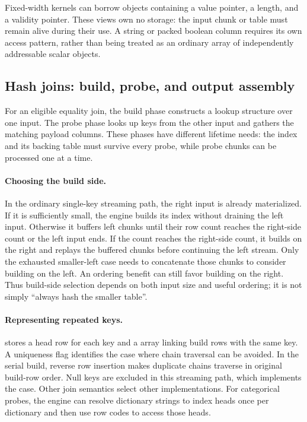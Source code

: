 Fixed-width kernels can borrow  objects containing a value
pointer, a length, and a validity pointer. These views own no storage: the
input chunk or table must remain alive during their use. A string or packed
boolean column requires its own access pattern, rather than being treated
as an ordinary array of independently addressable scalar objects.


\subsection{Hash joins: build, probe, and output assembly}
For an eligible equality join, the build phase constructs a lookup structure
over one input. The probe phase looks up keys from the other input and gathers
the matching payload columns. These phases have different lifetime needs:
the index and its backing table must survive every probe, while probe chunks
can be processed one at a time.

\paragraph{Choosing the build side.}
In the ordinary single-key streaming path, the right input is already
materialized. If it is sufficiently small, the engine builds its index without
draining the left input. Otherwise it buffers left chunks until their row count
reaches the right-side count or the left input ends. If the count reaches the
right-side count, it builds on the right and replays the buffered chunks before
continuing the left stream. Only the exhausted smaller-left case needs to
concatenate those chunks to consider building on the left. An ordering benefit
can still favor building on the right. Thus build-side selection depends on
both input size and useful ordering; it is not simply ``always hash the
smaller table''.

\paragraph{Representing repeated keys.}
 stores a head row for each key and a 
array linking build rows with the same key. A uniqueness flag identifies the
case where chain traversal can be avoided. In the serial build, reverse row
insertion makes duplicate chains traverse in original build-row order.
Null keys are excluded in this streaming path, which implements the
 case. Other join semantics select other implementations.
For categorical probes, the engine can resolve dictionary strings to index
heads once per dictionary and then use row codes to access those heads.

